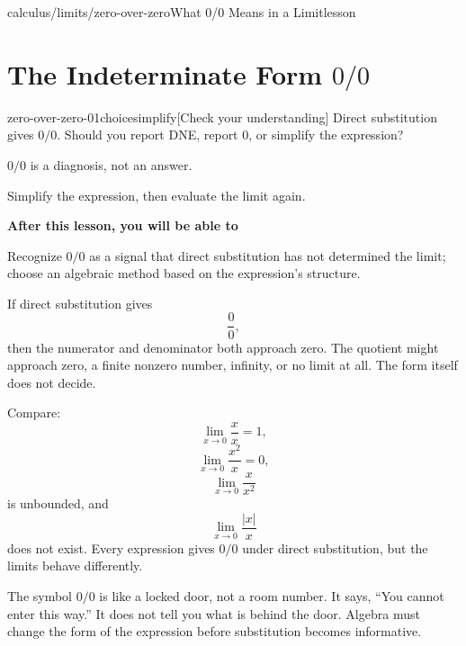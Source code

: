 \documentclass[11pt,openany]{book}
\theoremstyle{bgplain}
\newcounter{bgcheck}[section]
\newcommand{\lessonobjective}[1]{%
  \par\Needspace{4\baselineskip}\addvspace{0.6em}%
  {\bfseries\color{BGInk}After this lesson, you will be able to}\par\smallskip
  #1\par\addvspace{0.5em}%
}
\begin{document}
\begin{webpage}{calculus/limits/zero-over-zero}{What 0/0 Means in a Limit}{lesson}
\section{The Indeterminate Form \texorpdfstring{\(0/0\)}{0/0}}


\begin{bgcheck}{zero-over-zero-01}{choice}{simplify}[Check your understanding]
Direct substitution gives \(0/0\). Should you report DNE, report 0, or simplify the expression?
\begin{bghint}
\(0/0\) is a diagnosis, not an answer.
\end{bghint}
\begin{bgreveal}
Simplify the expression, then evaluate the limit again.
\end{bgreveal}
\end{bgcheck}



\lessonobjective{
Recognize \(0/0\) as a signal that direct substitution has not determined the limit; choose an algebraic method based on the expression's structure.
}

If direct substitution gives
\[
  \frac00,
\]
then the numerator and denominator both approach zero. The quotient might approach zero, a finite nonzero number, infinity, or no limit at all. The form itself does not decide.

Compare:
\[
  \lim_{x\to0}\frac{x}{x}=1,
\]
\[
  \lim_{x\to0}\frac{x^2}{x}=0,
\]
\[
  \lim_{x\to0}\frac{x}{x^2}
\]
is unbounded, and
\[
  \lim_{x\to0}\frac{|x|}{x}
\]
does not exist. Every expression gives \(0/0\) under direct substitution, but the limits behave differently.

\begin{bgconcept}
The symbol \(0/0\) is like a locked door, not a room number. It says, ``You cannot enter this way.'' It does not tell you what is behind the door. Algebra must change the form of the expression before substitution becomes informative.
\end{bgconcept}


\end{webpage}
\end{document}
